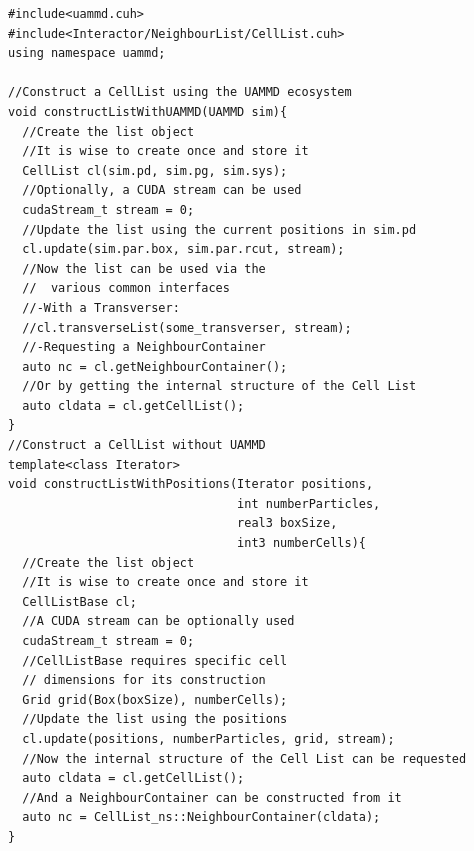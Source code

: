 \documentclass[ twoside,openright,titlepage,numbers=noenddot,%
headinclude,footinclude,cleardoublepage=empty,abstract=on,
BCOR=5mm,paper=a4,fontsize=11pt, dvipsnames
]{scrreprt}
\def\ucpp{uammd_cpp_lexer.py:UAMMDCppLexer -x}
\begin{document}
\begin{verbatim}
#include<uammd.cuh>
#include<Interactor/NeighbourList/CellList.cuh>
using namespace uammd;

//Construct a CellList using the UAMMD ecosystem
void constructListWithUAMMD(UAMMD sim){
  //Create the list object
  //It is wise to create once and store it
  CellList cl(sim.pd, sim.pg, sim.sys);
  //Optionally, a CUDA stream can be used
  cudaStream_t stream = 0;
  //Update the list using the current positions in sim.pd
  cl.update(sim.par.box, sim.par.rcut, stream);
  //Now the list can be used via the
  //  various common interfaces
  //-With a Transverser:
  //cl.transverseList(some_transverser, stream);
  //-Requesting a NeighbourContainer
  auto nc = cl.getNeighbourContainer();
  //Or by getting the internal structure of the Cell List
  auto cldata = cl.getCellList();
}
//Construct a CellList without UAMMD
template<class Iterator>
void constructListWithPositions(Iterator positions, 
                                int numberParticles,
                                real3 boxSize, 
                                int3 numberCells){
  //Create the list object
  //It is wise to create once and store it
  CellListBase cl;
  //A CUDA stream can be optionally used
  cudaStream_t stream = 0;
  //CellListBase requires specific cell 
  // dimensions for its construction
  Grid grid(Box(boxSize), numberCells);
  //Update the list using the positions
  cl.update(positions, numberParticles, grid, stream);
  //Now the internal structure of the Cell List can be requested
  auto cldata = cl.getCellList();
  //And a NeighbourContainer can be constructed from it
  auto nc = CellList_ns::NeighbourContainer(cldata);
}
\end{verbatim}
\end{document}
